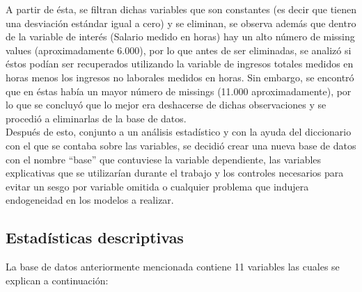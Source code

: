 \documentclass[12pt]{article}
\begin{document}
A partir de ésta, se filtran dichas variables que son constantes (es decir que tienen una desviación estándar igual a cero) y se eliminan, se observa además que dentro de la variable de interés (Salario medido en horas) hay un alto número de missing values (aproximadamente 6.000), por lo que antes de ser eliminadas, se analizó si éstos podían ser recuperados utilizando la variable de ingresos totales medidos en horas menos los ingresos no laborales medidos en horas. Sin embargo, se encontró que en éstas había un mayor número de missings (11.000 aproximadamente), por lo que se concluyó que lo mejor era deshacerse de dichas observaciones y se procedió a eliminarlas de la base de datos.\\

Después de esto, conjunto a un análisis estadístico y con la ayuda del diccionario con el que se contaba sobre las variables, se decidió crear una nueva base de datos con el nombre “base” que contuviese la variable dependiente, las variables explicativas que se utilizarían durante el trabajo y los controles necesarios para evitar un sesgo por variable omitida o cualquier problema que indujera endogeneidad en los modelos a realizar.

\subsection{Estadísticas descriptivas}

La base de datos anteriormente mencionada contiene 11 variables las cuales se explican a continuación:
\end{document}

